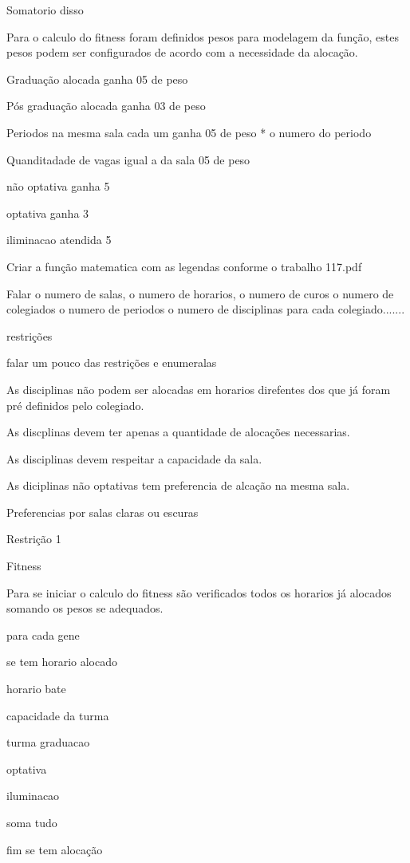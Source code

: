 
Somatorio disso

Para o calculo do fitness foram definidos pesos para modelagem da função, estes pesos podem ser configurados de acordo com a necessidade da alocação.

Graduação alocada ganha 05 de peso

Pós graduação alocada ganha 03 de peso

Periodos na mesma sala cada um ganha 05 de peso * o numero do periodo

Quanditadade de vagas igual a da sala 05 de peso

não optativa ganha 5

optativa ganha 3

iliminacao atendida 5

Criar a função matematica com as legendas conforme o trabalho 117.pdf

Falar o numero de salas, o numero de horarios, o numero de curos o numero de colegiados o numero de periodos o numero de disciplinas para cada colegiado.......

restrições 


falar um pouco das restrições e enumeralas

As disciplinas não podem ser alocadas em horarios direfentes dos que já foram pré definidos pelo colegiado.

As discplinas devem ter apenas a quantidade de alocações necessarias.

As disciplinas devem respeitar a capacidade da sala.

As diciplinas não optativas tem preferencia de alcação na mesma sala.

Preferencias por salas claras ou escuras

Restrição 1 


Fitness

Para se iniciar o calculo do fitness são verificados todos os horarios já alocados somando os pesos se adequados.

para cada gene

se tem horario alocado 

horario bate

capacidade da turma

turma graduacao

optativa

iluminacao

soma tudo

fim se tem alocação

